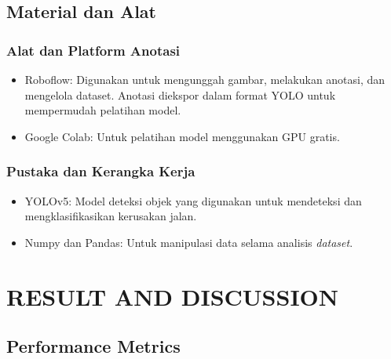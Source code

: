 \documentclass[12pt,a4paper]{article}
\begin{document}
\subsection{Material dan Alat}

\subsubsection{Alat dan Platform Anotasi}
\begin{itemize}
    \item Roboflow: Digunakan untuk mengunggah gambar, melakukan anotasi, dan mengelola dataset. Anotasi diekspor dalam format YOLO untuk mempermudah pelatihan model.
    \item Google Colab: Untuk pelatihan model menggunakan GPU gratis.
\end{itemize}

\subsubsection{Pustaka dan Kerangka Kerja}
\begin{itemize}
    \item YOLOv5: Model deteksi objek yang digunakan untuk mendeteksi dan mengklasifikasikan kerusakan jalan.
    \item Numpy dan Pandas: Untuk manipulasi data selama analisis \textit{dataset}.
\end{itemize}

\section{RESULT AND DISCUSSION}
\subsection{Performance Metrics}
\end{document}
